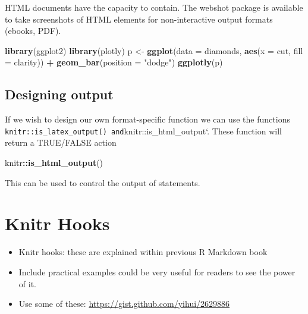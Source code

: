 \documentclass[]{book}
\newenvironment{Shaded}{\begin{snugshade}}{\end{snugshade}}
\newcommand{\KeywordTok}[1]{\textcolor[rgb]{0.13,0.29,0.53}{\textbf{#1}}}
\newcommand{\DataTypeTok}[1]{\textcolor[rgb]{0.13,0.29,0.53}{#1}}
\newcommand{\StringTok}[1]{\textcolor[rgb]{0.31,0.60,0.02}{#1}}
\newcommand{\OperatorTok}[1]{\textcolor[rgb]{0.81,0.36,0.00}{\textbf{#1}}}
\newcommand{\NormalTok}[1]{#1}
\providecommand{\tightlist}{%
  \setlength{\itemsep}{0pt}\setlength{\parskip}{0pt}}
\begin{document}
HTML documents have the capacity to contain. The webshot package is
available to take screenshots of HTML elements for non-interactive
output formats (ebooks, PDF).

\begin{Shaded}
\begin{Highlighting}[]
\KeywordTok{library}\NormalTok{(ggplot2)}
\KeywordTok{library}\NormalTok{(plotly)}
\NormalTok{p <-}\StringTok{ }\KeywordTok{ggplot}\NormalTok{(}\DataTypeTok{data =}\NormalTok{ diamonds, }\KeywordTok{aes}\NormalTok{(}\DataTypeTok{x =}\NormalTok{ cut, }\DataTypeTok{fill =}\NormalTok{ clarity)) }\OperatorTok{+}
\StringTok{            }\KeywordTok{geom_bar}\NormalTok{(}\DataTypeTok{position =} \StringTok{"dodge"}\NormalTok{)}
\KeywordTok{ggplotly}\NormalTok{(p)}
\end{Highlighting}
\end{Shaded}

\section{Designing output}\label{designing-output}

If we wish to design our own format-specific function we can use the
functions
\texttt{knitr::is\_latex\_output()\ and}knitr::is\_html\_output`. These
function will return a TRUE/FALSE action

\begin{Shaded}
\begin{Highlighting}[]
\NormalTok{knitr}\OperatorTok{::}\KeywordTok{is_html_output}\NormalTok{()}
\end{Highlighting}
\end{Shaded}

This can be used to control the output of statements.

\chapter{Knitr Hooks}\label{knitr-hooks}

\begin{itemize}
\tightlist
\item
  Knitr hooks: these are explained within previous R Markdown book
\item
  Include practical examples could be very useful for readers to see the
  power of it.
\item
  Use some of these: \url{https://gist.github.com/yihui/2629886}
\end{itemize}
\end{document}
